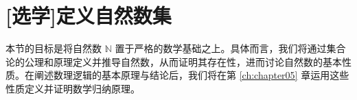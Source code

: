 \section[定义自然数集]{[选学]定义自然数集}\label{sec:section3.8}

本节的目标是将自然数 $\mathbb{N}$ 置于严格的数学基础之上。具体而言，我们将通过集合论的公理和原理定义并推导自然数，从而证明其存在性，进而讨论自然数的基本性质。在阐述数理逻辑的基本原理与结论后，我们将在第 \ref{ch:chapter05} 章运用这些性质定义并证明数学归纳原理。





